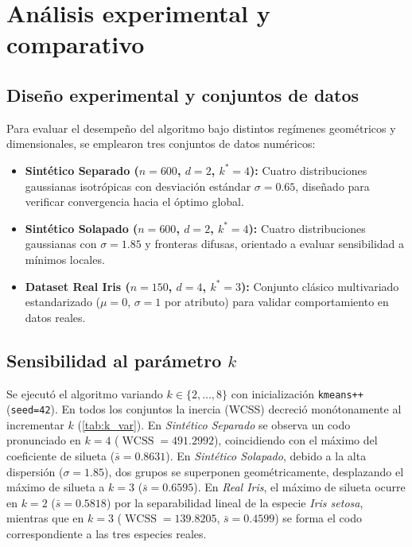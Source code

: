 \documentclass[11pt,letterpaper]{article}
\numberwithin{equation}{section}
\DeclareMathOperator{\WCSS}{WCSS}
\theoremstyle{plain}
\begin{document}

\section{Análisis experimental y comparativo}

\subsection{Diseño experimental y conjuntos de datos}
Para evaluar el desempeño del algoritmo bajo distintos regímenes geométricos y dimensionales, se emplearon tres conjuntos de datos numéricos:
\begin{itemize}
    \item \textbf{Sintético Separado ($n=600$, $d=2$, $k^*=4$):} Cuatro distribuciones gaussianas isotrópicas con desviación estándar $\sigma = 0.65$, diseñado para verificar convergencia hacia el óptimo global.
    \item \textbf{Sintético Solapado ($n=600$, $d=2$, $k^*=4$):} Cuatro distribuciones gaussianas con $\sigma = 1.85$ y fronteras difusas, orientado a evaluar sensibilidad a mínimos locales.
    \item \textbf{Dataset Real Iris ($n=150$, $d=4$, $k^*=3$):} Conjunto clásico multivariado estandarizado ($\mu=0$, $\sigma=1$ por atributo) para validar comportamiento en datos reales.
\end{itemize}

\subsection{Sensibilidad al parámetro \texorpdfstring{$k$}{k}}
Se ejecutó el algoritmo variando $k \in \{2, \dots, 8\}$ con inicialización \texttt{kmeans++} (\texttt{seed=42}). En todos los conjuntos la inercia (WCSS) decreció monótonamente al incrementar $k$ (\cref{tab:k_var}). En \textit{Sintético Separado} se observa un codo pronunciado en $k=4$ ($\WCSS = 491.2992$), coincidiendo con el máximo del coeficiente de silueta ($\bar{s} = 0.8631$). En \textit{Sintético Solapado}, debido a la alta dispersión ($\sigma=1.85$), dos grupos se superponen geométricamente, desplazando el máximo de silueta a $k=3$ ($\bar{s} = 0.6595$). En \textit{Real Iris}, el máximo de silueta ocurre en $k=2$ ($\bar{s} = 0.5818$) por la separabilidad lineal de la especie \textit{Iris setosa}, mientras que en $k=3$ ($\WCSS = 139.8205$, $\bar{s} = 0.4599$) se forma el codo correspondiente a las tres especies reales.
\end{document}
